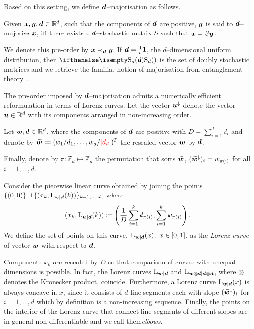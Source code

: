 \documentclass[pra,
aps,
twocolumn,
superscriptaddress,
groupedaddress,
nofootinbib,
reprint
]{revtex4-1}
\begin{document}
Based on this setting, we define $\bm{d}$--majorisation as follows.
\begin{definition}\label{def:dmajor}
    Given $\bm{x}, \bm{y}, \bm{d} \in \mathbb{R}^d$, such that the components of $\bm{d}$ are positive, $\bm{y}$ is said to $\bm{d}$--majorise $\bm{x}$, iff there exists a $\bm{d}$--stochastic matrix $S$ such that $\bm{x} = S\bm{y}$.
\end{definition}
We denote this pre-order by $\bm{x} \prec_{\bm{d}} \bm{y}$.
If $\bm{d} = \frac{1}{d}\bm{1}$, the $d$--dimensional uniform distribution, then $\stoch$ is the set of doubly stochastic matrices and we retrieve the familiar notion of majorisation from entanglement theory~\cite{Nielsen_1999}.

The pre-order imposed by $\bm{d}$--majorisation admits a numerically efficient reformulation in terms of Lorenz curves.
Let the vector $\bm{u}^\downarrow$ denote the vector $\bm{u} \in \mathbb{R}^d$ with its components arranged in non-increasing order.
\begin{definition}\label{def:lc}
    Let $\bm{w}, \bm{d} \in \mathbb{R}^d$, where the components of $\bm{d}$ are positive with $D = \sum_{i=1}^d d_i$ and denote by $\widetilde{\bm{w}} \coloneqq (w_1/d_1, \dots, w_d/{\color{red}[d_d]})^T$ the rescaled vector $\bm{w}$ by $\bm{d}$.
    
    Finally, denote by $\pi: \mathbb{Z}_d \mapsto \mathbb{Z}_d$ the permutation that sorts $\widetilde{\bm{w}}$, $(\widetilde{\bm{w}}^\downarrow)_i = w_{\pi(i)}$ for all $i=1,\dots,d$.
    
    Consider the piecewise linear curve obtained by joining the points $\{(0,0)\} \cup \{ (x_k, {{\rm{L}}_{\bm{w}|\bm{d}}}(k)) \}_{k=1,\dots,d}$, where
    \begin{equation}\label{eq:lorenz}
        (x_k, {{\rm{L}}_{\bm{w}|\bm{d}}}(k)) \coloneqq \left( \frac{1}{D}\sum_{i=1}^k d_{\pi(i)}, \sum_{i=1}^k w_{\pi(i)} \right).
    \end{equation}
    We define the set of points on this curve, ${{\rm{L}}_{\bm{w}|\bm{d}}}(x),\ x \in [0,1]$, as the \emph{Lorenz curve} of vector $\bm{w}$ with respect to $\bm{d}$.
\end{definition}
Components $x_k$ are rescaled by $D$ so that comparison of curves with unequal dimensions is possible.
In fact, the Lorenz curves ${{\rm{L}}_{\bm{w}|\bm{d}}}$ and ${{\rm{L}}_{\bm{w} \otimes \bm{d}|\bm{d} \otimes \bm{d}}}$, where $\otimes$ denotes the Kronecker product, coincide.
Furthermore, a Lorenz curve ${{\rm{L}}_{\bm{w}|\bm{d}}}(x)$ is always concave in $x$, since it consists of $d$ line segments each with slope $(\widetilde{\bm{w}}^\downarrow)_i$ for $i=1,\dots,d$ which by definition is a non-increasing sequence.
Finally, the points on the interior of the Lorenz curve that connect line segments of different slopes are in general non-differentiable and we call them\emph{elbows}.
\end{document}

